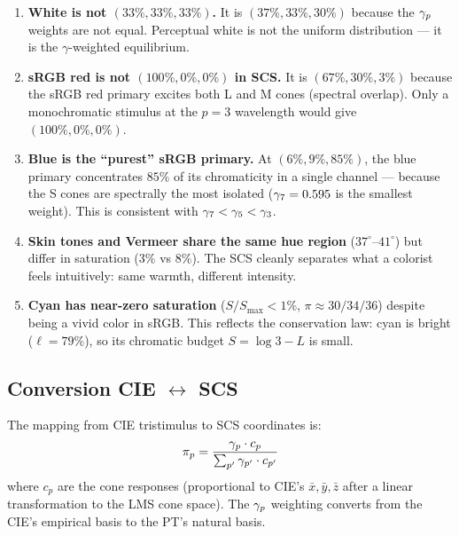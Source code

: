 \documentclass[12pt,a4paper]{article}
\begin{document}
\begin{enumerate}[nosep]
\item \textbf{White is not $(33\%, 33\%, 33\%)$.} It is $(37\%, 33\%,
  30\%)$ because the $\gamma_{p}$ weights are not equal. Perceptual
  white is not the uniform distribution --- it is the
  $\gamma$-weighted equilibrium.

\item \textbf{sRGB red is not $(100\%, 0\%, 0\%)$ in SCS.} It is
  $(67\%, 30\%, 3\%)$ because the sRGB red primary excites both L and
  M cones (spectral overlap). Only a monochromatic stimulus at the
  $p=3$ wavelength would give $(100\%, 0\%, 0\%)$.

\item \textbf{Blue is the ``purest'' sRGB primary.} At $(6\%, 9\%,
  85\%)$, the blue primary concentrates $85\%$ of its chromaticity in
  a single channel --- because the S cones are spectrally the most
  isolated ($\gamma_{7} = 0.595$ is the smallest weight). This is
  consistent with $\gamma_{7} < \gamma_{5} < \gamma_{3}$.

\item \textbf{Skin tones and Vermeer share the same hue region}
  ($37^\circ$--$41^\circ$) but differ in saturation ($3\%$ vs $8\%$).
  The SCS cleanly separates what a colorist feels intuitively: same
  warmth, different intensity.

\item \textbf{Cyan has near-zero saturation} ($S/S_{\max} < 1\%$,
  $\pi \approx 30/34/36$) despite being a vivid color in sRGB. This
  reflects the conservation law: cyan is bright ($\ell = 79\%$), so
  its chromatic budget $S = \log 3 - L$ is small.
\end{enumerate}

\subsection{Conversion CIE $\leftrightarrow$ SCS}

The mapping from CIE tristimulus to SCS coordinates is:
\begin{equation}
  \pi_p = \frac{\gamma_{p} \cdot c_p}{\sum_{p'} \gamma_{p'} \cdot c_{p'}}
\end{equation}
where $c_p$ are the cone responses (proportional to CIE's $\bar{x},
\bar{y}, \bar{z}$ after a linear transformation to the LMS cone space).
The $\gamma_{p}$ weighting converts from the CIE's empirical basis to
the PT's natural basis.

\end{document}
